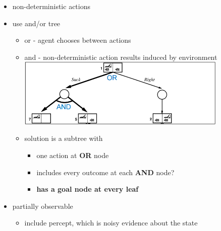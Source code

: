 \documentclass[11pt]{article}
\begin{document}
\begin{description}
\begin{itemize}
	\item non-deterministic actions
	\item use and/or tree
	\begin{itemize}
		\item or - agent chooses between actions
		\item and - non-deterministic action results induced by environment
		\\ \includegraphics[width=100mm,scale=1]{and_or}
		\item solution is a subtree with
		\begin{itemize}
			\item one action at \textbf{OR} node
			\item includes every outcome at each \textbf{AND} node?
			\item \textbf{has a goal node at every leaf}
		\end{itemize}
	\end{itemize}

	\item partially observable
	\begin{itemize}
		\item include percept, which is noisy evidence about the state
	\end{itemize}
\end{itemize}


\end{description}
\end{document}
